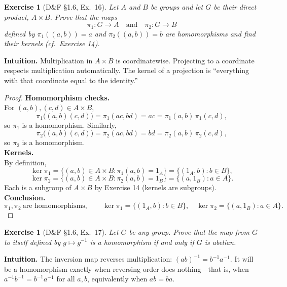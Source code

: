 \documentclass[12pt]{article}
\newtheorem{exercise}[theorem]{Exercise}
\theoremstyle{definition}
\begin{document}
\newpage

\begin{exercise}[D\&F §1.6, Ex.~16]
Let $A$ and $B$ be groups and let $G$ be their direct product, $A\times B$. Prove that the maps 
\[
\pi_1:G\to A\quad\text{and}\quad \pi_2:G\to B
\]
defined by $\pi_1((a,b))=a$ and $\pi_2((a,b))=b$ are homomorphisms and find their kernels (cf.\ Exercise 14).
\end{exercise}

\dotfill

\noindent\textbf{Intuition.}
Multiplication in $A\times B$ is coordinatewise. Projecting to a coordinate respects multiplication automatically. The kernel of a projection is “everything with that coordinate equal to the identity.”\\

\dotfill

\begin{proof}
\noindent\textbf{Homomorphism checks.}\\
\noindent For $(a,b),(c,d)\in A\times B$,
\[
\pi_1\big((a,b)(c,d)\big)=\pi_1(ac,bd)=ac=\pi_1(a,b)\,\pi_1(c,d),
\]
so $\pi_1$ is a homomorphism. Similarly,
\[
\pi_2\big((a,b)(c,d)\big)=\pi_2(ac,bd)=bd=\pi_2(a,b)\,\pi_2(c, d),
\]
so $\pi_2$ is a homomorphism.\\

\noindent\textbf{Kernels.}\\
\noindent By definition,
\[
\ker\pi_1=\{(a,b)\in A\times B:\pi_1(a,b)=1_A\}=\{(1_A,b):b\in B\},
\]
\[
\ker\pi_2=\{(a,b)\in A\times B:\pi_2(a,b)=1_B\}=\{(a,1_B):a\in A\}.
\]
Each is a subgroup of $A\times B$ by Exercise 14 (kernels are subgroups).\\

\noindent\textbf{Conclusion.}
\[
\boxed{
\pi_1,\pi_2\ \text{are homomorphisms},\qquad
\ker\pi_1=\{(1_A,b):b\in B\},\quad
\ker\pi_2=\{(a,1_B):a\in A\}.
}
\]
\end{proof}

\newpage

\begin{exercise}[D\&F §1.6, Ex.~17]
Let $G$ be any group. Prove that the map from $G$ to itself defined by $g\mapsto g^{-1}$ is a homomorphism if and only if $G$ is abelian.
\end{exercise}

\dotfill

\noindent\textbf{Intuition.}
The inversion map reverses multiplication: $(ab)^{-1}=b^{-1}a^{-1}$.  
It will be a homomorphism exactly when reversing order does nothing—that is, when $a^{-1}b^{-1}=b^{-1}a^{-1}$ for all $a,b$, equivalently when $ab=ba$.\\
\end{document}
